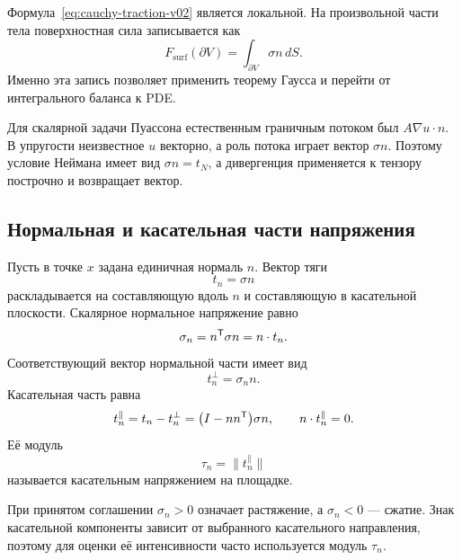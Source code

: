 Формула~\eqref{eq:cauchy-traction-v02} является локальной. На произвольной части тела поверхностная сила записывается как
\begin{equation}
\label{eq:internal-force-through-stress-v02}
F_{\mathrm{surf}}(\partial V)
=
\int_{\partial V}\sigma n\,dS.
\end{equation}
Именно эта запись позволяет применить теорему Гаусса и перейти от интегрального баланса к PDE.

\begin{connection}
Для скалярной задачи Пуассона естественным граничным потоком был $A\nabla u\cdot n$. В упругости неизвестное $u$ векторно, а роль потока играет вектор $\sigma n$. Поэтому условие Неймана имеет вид $\sigma n=t_N$, а дивергенция применяется к тензору построчно и возвращает вектор.
\end{connection}

\subsection{Нормальная и касательная части напряжения}

Пусть в точке $x$ задана единичная нормаль $n$. Вектор тяги
\[
t_n=\sigma n
\]
раскладывается на составляющую вдоль $n$ и составляющую в касательной плоскости. Скалярное нормальное напряжение равно
\begin{equation}
\label{eq:normal-stress-scalar-v02}
\sigma_n=n^{\mathsf{T}}\sigma n=n\cdot t_n.
\end{equation}
Соответствующий вектор нормальной части имеет вид
\begin{equation}
\label{eq:normal-traction-vector-v02}
t_n^{\perp}=\sigma_n n.
\end{equation}
Касательная часть равна
\begin{equation}
\label{eq:shear-traction-vector-v02}
t_n^{\parallel}
=
t_n-t_n^{\perp}
=
\bigl(I-nn^{\mathsf{T}}\bigr)\sigma n,
\qquad
n\cdot t_n^{\parallel}=0.
\end{equation}
Её модуль
\begin{equation}
\label{eq:shear-stress-magnitude-v02}
\tau_n=\lVert t_n^{\parallel}\rVert
\end{equation}
называется касательным напряжением на площадке.

При принятом соглашении $\sigma_n>0$ означает растяжение, а $\sigma_n<0$ --- сжатие. Знак касательной компоненты зависит от выбранного касательного направления, поэтому для оценки её интенсивности часто используется модуль $\tau_n$.

